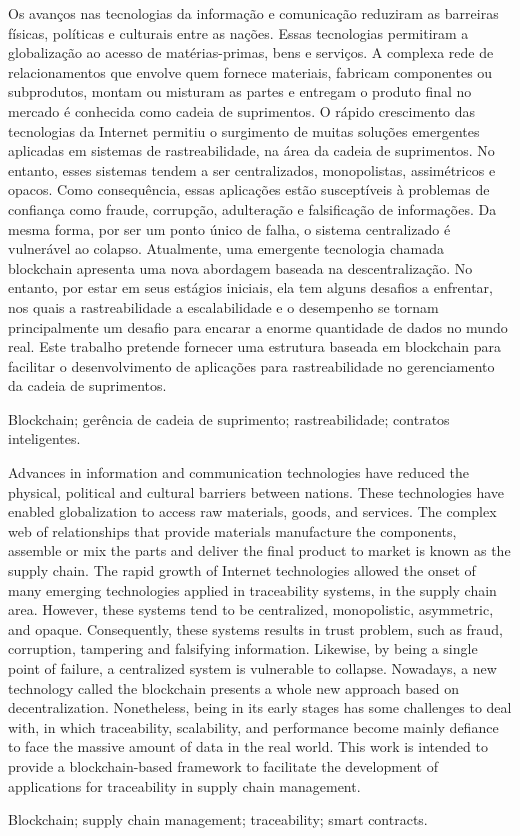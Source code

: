 
\resumo
Os avanços nas tecnologias da informação e comunicação reduziram as barreiras físicas, políticas e culturais entre as nações. Essas tecnologias permitiram a globalização ao acesso de matérias-primas, bens e serviços. A complexa rede de relacionamentos que envolve quem fornece materiais, fabricam componentes ou subprodutos, montam ou misturam as partes e entregam o produto final no mercado é conhecida como cadeia de suprimentos. O rápido crescimento das tecnologias da Internet permitiu o surgimento de muitas soluções emergentes aplicadas em sistemas de rastreabilidade, na área da cadeia de suprimentos. No entanto, esses sistemas tendem a ser centralizados, monopolistas, assimétricos e opacos. Como consequência, essas aplicações estão susceptíveis à problemas de confiança como fraude, corrupção, adulteração e falsificação de informações. Da mesma forma, por ser um ponto único de falha, o sistema centralizado é vulnerável ao colapso. Atualmente, uma emergente tecnologia chamada blockchain apresenta uma nova abordagem baseada na descentralização. No entanto, por estar em seus estágios iniciais, ela tem alguns desafios a enfrentar, nos quais a rastreabilidade a escalabilidade e o desempenho se tornam principalmente um desafio para encarar a enorme quantidade de dados no mundo real. Este trabalho pretende fornecer uma estrutura baseada em blockchain para facilitar o desenvolvimento de aplicações para rastreabilidade no gerenciamento da cadeia de suprimentos.


\begin{keywords}
Blockchain; gerência de cadeia de suprimento; rastreabilidade; contratos inteligentes.
\end{keywords}


\abstract
Advances in information and communication technologies have reduced the physical, political and cultural barriers between nations. These technologies have enabled globalization to access raw materials, goods, and services. The complex web of relationships that provide materials manufacture the components, assemble or mix the parts and deliver the final product to market is known as the supply chain. The rapid growth of Internet technologies allowed the onset of many emerging technologies applied in traceability systems, in the supply chain area. However, these systems tend to be centralized, monopolistic, asymmetric, and opaque. Consequently, these systems results in trust problem, such as fraud, corruption, tampering and falsifying information. Likewise, by being a single point of failure, a centralized system is vulnerable to collapse. Nowadays, a new technology called the blockchain presents a whole new approach based on decentralization. Nonetheless, being in its early stages has some challenges to deal with, in which traceability, scalability, and performance become mainly defiance to face the massive amount of data in the real world.  This work is intended to provide a blockchain-based framework to facilitate the development of applications for traceability in supply chain management.

\begin{keywords}
Blockchain; supply chain management; traceability; smart contracts.
\end{keywords}
